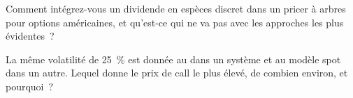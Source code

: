 \begin{interviewq}\label{iq:dv:dividends-borrow-and-forwards:5}
Comment intégrez-vous un dividende en espèces discret dans un pricer à arbres pour options américaines, et
qu'est-ce qui ne va pas avec les approches les plus évidentes~?
\end{interviewq}

\begin{interviewq}\label{iq:dv:dividends-borrow-and-forwards:6}
La même volatilité de 25~\% est donnée au  dans un système et au modèle spot
dans un autre. Lequel donne le prix de call le plus élevé, de combien environ, et pourquoi~?
\end{interviewq}
